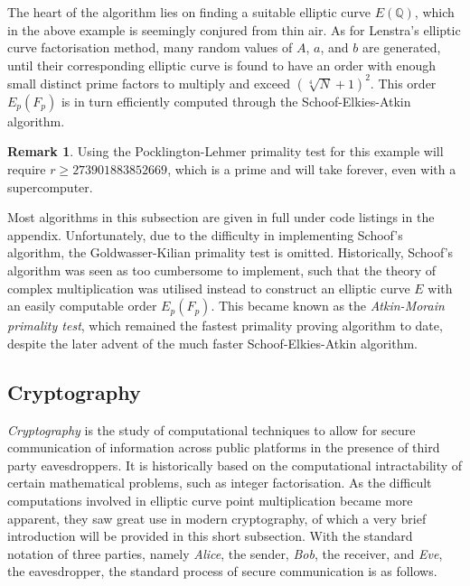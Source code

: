 \documentclass{article}
\newcommand{\Q}{\mathbb{Q}}
\newcommand{\rb}[1]{\left( #1 \right)}
\theoremstyle{definition}\newtheorem*{definition}{Definition}
\theoremstyle{definition}\newtheorem*{example}{Example}
\theoremstyle{definition}\newtheorem*{remark}{Remark}
\begin{document}
The heart of the algorithm lies on finding a suitable elliptic curve $ E\rb{\Q} $, which in the above example is seemingly conjured from thin air. As for Lenstra's elliptic curve factorisation method, many random values of $ A $, $ a $, and $ b $ are generated, until their corresponding elliptic curve is found to have an order with enough small distinct prime factors to multiply and exceed $ \rb{\sqrt[4]{N} + 1}^2 $. This order $ E_p\rb{F_p} $ is in turn efficiently computed through the Schoof-Elkies-Atkin algorithm.

\begin{remark}
Using the Pocklington-Lehmer primality test for this example will require $ r \ge 273901883852669 $, which is a prime and will take forever, even with a supercomputer.
\end{remark}

Most algorithms in this subsection are given in full under code listings in the appendix. Unfortunately, due to the difficulty in implementing Schoof's algorithm, the Goldwasser-Kilian primality test is omitted. Historically, Schoof's algorithm was seen as too cumbersome to implement, such that the theory of complex multiplication was utilised instead to construct an elliptic curve $ E $ with an easily computable order $ E_p\rb{F_p} $. This became known as the \emph{Atkin-Morain primality test}, which remained the fastest primality proving algorithm to date, despite the later advent of the much faster Schoof-Elkies-Atkin algorithm.

\pagebreak

\subsection{Cryptography}

\emph{Cryptography} is the study of computational techniques to allow for secure communication of information across public platforms in the presence of third party eavesdroppers. It is historically based on the computational intractability of certain mathematical problems, such as integer factorisation. As the difficult computations involved in elliptic curve point multiplication became more apparent, they saw great use in modern cryptography, of which a very brief introduction will be provided in this short subsection. With the standard notation of three parties, namely \emph{Alice}, the sender, \emph{Bob}, the receiver, and \emph{Eve}, the eavesdropper, the standard process of secure communication is as follows.
\end{document}
